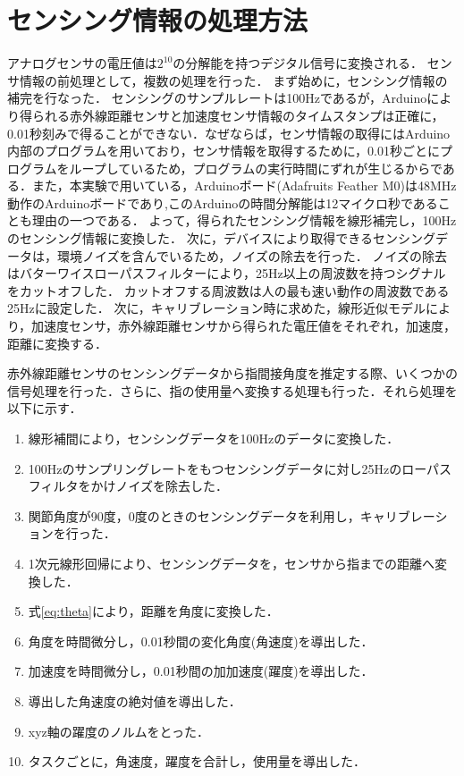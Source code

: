 \section{センシング情報の処理方法}
アナログセンサの電圧値は$2^10$の分解能を持つデジタル信号に変換される．
センサ情報の前処理として，複数の処理を行った．
まず始めに，センシング情報の補完を行なった．
センシングのサンプルレートは100Hzであるが，Arduinoにより得られる赤外線距離センサと加速度センサ情報のタイムスタンプは正確に，0.01秒刻みで得ることができない．なぜならば，センサ情報の取得にはArduino内部のプログラムを用いており，センサ情報を取得するために，0.01秒ごとにプログラムをループしているため，プログラムの実行時間にずれが生じるからである．また，本実験で用いている，Arduinoボード(Adafruits Feather M0)は48MHz動作のArduinoボードであり,このArduinoの時間分解能は12マイクロ秒であることも理由の一つである．
よって，得られたセンシング情報を線形補完し，100Hzのセンシング情報に変換した．
次に，デバイスにより取得できるセンシングデータは，環境ノイズを含んでいるため，ノイズの除去を行った．
ノイズの除去はバターワイスローパスフィルターにより，25Hz以上の周波数を持つシグナルをカットオフした．
カットオフする周波数は人の最も速い動作の周波数である25Hz\cite{Friedman2014,VanGalen1990,Mason2001,Simone2007}に設定した．
次に，キャリブレーション時に求めた，線形近似モデルにより，加速度センサ，赤外線距離センサから得られた電圧値をそれぞれ，加速度，距離に変換する．



赤外線距離センサのセンシングデータから指間接角度を推定する際、いくつかの信号処理を行った．さらに、指の使用量へ変換する処理も行った．それら処理を以下に示す．

\begin{enumerate}
 \item 線形補間により，センシングデータを100Hzのデータに変換した．
 \item 100Hzのサンプリングレートをもつセンシングデータに対し25Hzのローパスフィルタをかけノイズを除去した．
\item 関節角度が90度，0度のときのセンシングデータを利用し，キャリブレーションを行った．
 \item 1次元線形回帰により、センシングデータを，センサから指までの距離へ変換した．
 \item 式\ref{eq:theta}により，距離を角度に変換した．
 \item 角度を時間微分し，0.01秒間の変化角度(角速度)を導出した．
 \item 加速度を時間微分し，0.01秒間の加加速度(躍度)を導出した．
 \item 導出した角速度の絶対値を導出した．
 \item xyz軸の躍度のノルムをとった．
 \item タスクごとに，角速度，躍度を合計し，使用量を導出した．
\end{enumerate}


